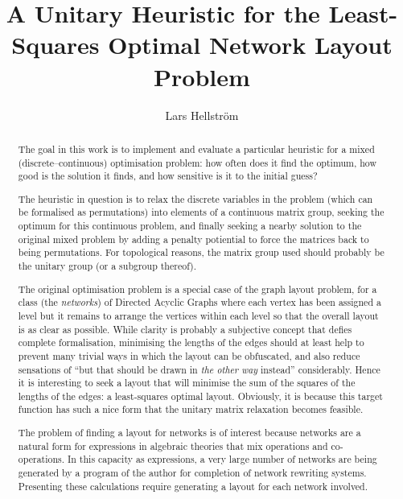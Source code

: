 \documentclass{article}
\theoremstyle{definition}
\begin{document}
\title{A Unitary Heuristic for the Least-Squares Optimal Network 
  Layout Problem}
\author{Lars Hellstr\"om}
\maketitle

\begin{abstract}
  The goal in this work is to implement and evaluate a particular 
  heuristic for a mixed (discrete--continuous) optimisation problem: 
  how often does it find the optimum, how good is the solution it 
  finds, and how sensitive is it to the initial guess?
  
  The heuristic in question is to relax the discrete variables in the 
  problem (which can be formalised as permutations) into elements of 
  a continuous matrix group, seeking the optimum for this continuous 
  problem, and finally seeking a nearby solution to the original 
  mixed problem by adding a penalty potiential to force the matrices 
  back to being permutations. For topological reasons, the matrix 
  group used should probably be the unitary group (or a subgroup 
  thereof).
  
  The original optimisation problem is a special case of the graph 
  layout problem, for a class (the \emph{networks}) of Directed Acyclic 
  Graphs where each vertex has been assigned a level but it remains 
  to arrange the vertices within each level so that the overall 
  layout is as clear as possible. While clarity is probably a 
  subjective concept that defies complete formalisation, minimising 
  the lengths of the edges should at least help to prevent many 
  trivial ways in which the layout can be obfuscated, and also reduce 
  sensations of ``but that should be drawn in \emph{the other way} 
  instead'' considerably. Hence it is interesting to seek a layout 
  that will minimise the sum of the squares of the lengths of the 
  edges: a least-squares optimal layout.
  Obviously, it is because this target function has such a nice 
  form that the unitary matrix relaxation becomes feasible.
  
  The problem of finding a layout for networks is of interest because 
  networks are a natural form for expressions in algebraic theories 
  that mix operations and co-operations. In this capacity as 
  expressions, a very large number of networks are being generated by 
  a program of the author for completion of network rewriting 
  systems. Presenting these calculations require generating a layout 
  for each network involved. 
\end{abstract}
\end{document}
